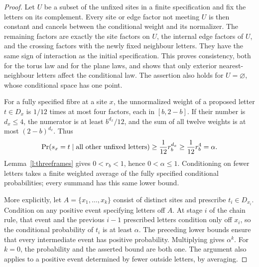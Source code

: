 \begin{proof}
Let \(U\) be a subset of the unfixed sites in a finite specification
and fix the letters on its complement. Every site or edge factor
not meeting \(U\) is then constant and cancels between the
conditional weight and its normalizer. The remaining factors are
exactly the site factors on \(U\), the internal edge factors of
\(U\), and the crossing factors with the newly fixed neighbour
letters. They have the same sign of interaction as the initial
specification. This proves consistency, both for the torus law and
for the plane laws, and shows that only exterior nearest-neighbour
letters affect the conditional law. The assertion also holds for
\(U=\varnothing\), whose conditional space has one point.

For a fully specified fibre at a site \(x\), the unnormalized
weight of a proposed letter \(t\in D_x\) is \(1/12\) times
at most four factors, each in \([b,2-b]\). If their number is
\(d_x\le4\), the numerator is at least \(b^{d_x}/12\),
and the sum of all twelve weights is at most \((2-b)^{d_x}\).
Thus
\[
 \Pr(s_x=t\mid\hbox{all other unfixed letters})
 \ge\frac1{12}r_b^{d_x}\ge\frac1{12}r_b^4=\alpha.
\]
Lemma~\ref{l:threeframes} gives \(0<r_b<1\), hence
\(0<\alpha\le1\). Conditioning on fewer letters takes a finite
weighted average of the fully specified conditional probabilities;
every summand has this same lower bound.

More explicitly, let \(A=\{x_1,\ldots,x_k\}\) consist of
distinct sites and prescribe \(t_i\in D_{x_i}\). Condition on
any positive event specifying letters off \(A\). At stage \(i\)
of the chain rule, that event and the previous \(i-1\) prescribed
letters condition only off \(x_i\), so the conditional probability
of \(t_i\) is at least \(\alpha\). The preceding lower bounds
ensure that every intermediate event has positive probability.
Multiplying gives \(\alpha^k\). For \(k=0\), the probability
and the asserted bound are both one. The argument also applies to
a positive event determined by fewer outside letters, by averaging.


\end{proof}
